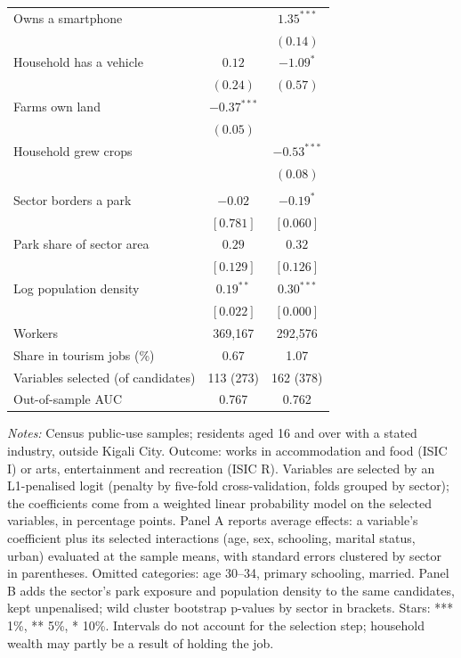 \documentclass[11pt]{article}
\begin{document}
\begin{table}[H]
\begin{tabular}{lcc}
Owns a smartphone &  & $1.35^{***}$ \\
 &  & $(0.14)$ \\
Household has a vehicle & $0.12$ & $-1.09^{*}$ \\
 & $(0.24)$ & $(0.57)$ \\
Farms own land & $-0.37^{***}$ &  \\
 & $(0.05)$ &  \\
Household grew crops &  & $-0.53^{***}$ \\
 &  & $(0.08)$ \\
\addlinespace
\multicolumn{3}{l}{\textit{Panel B. Sector variables (exposure model)}} \\
Sector borders a park & $-0.02$ & $-0.19^{*}$ \\
 & $[0.781]$ & $[0.060]$ \\
Park share of sector area & $0.29$ & $0.32$ \\
 & $[0.129]$ & $[0.126]$ \\
Log population density & $0.19^{**}$ & $0.30^{***}$ \\
 & $[0.022]$ & $[0.000]$ \\
\midrule
Workers & 369,167 & 292,576 \\
Share in tourism jobs (\%) & 0.67 & 1.07 \\
Variables selected (of candidates) & 113 (273) & 162 (378) \\
Out-of-sample AUC & 0.767 & 0.762 \\
\bottomrule
\end{tabular}
\begin{minipage}{0.95\textwidth}\footnotesize
\textit{Notes:} Census public-use samples; residents aged 16 and over with a stated industry, outside Kigali City. Outcome: works in accommodation and food (ISIC I) or arts, entertainment and recreation (ISIC R). Variables are selected by an L1-penalised logit (penalty by five-fold cross-validation, folds grouped by sector); the coefficients come from a weighted linear probability model on the selected variables, in percentage points. Panel A reports average effects: a variable's coefficient plus its selected interactions (age, sex, schooling, marital status, urban) evaluated at the sample means, with standard errors clustered by sector in parentheses. Omitted categories: age 30--34, primary schooling, married. Panel B adds the sector's park exposure and population density to the same candidates, kept unpenalised; wild cluster bootstrap p-values by sector in brackets. Stars: *** 1\%, ** 5\%, * 10\%. Intervals do not account for the selection step; household wealth may partly be a result of holding the job.
\end{minipage}
\end{table}
\end{document}
